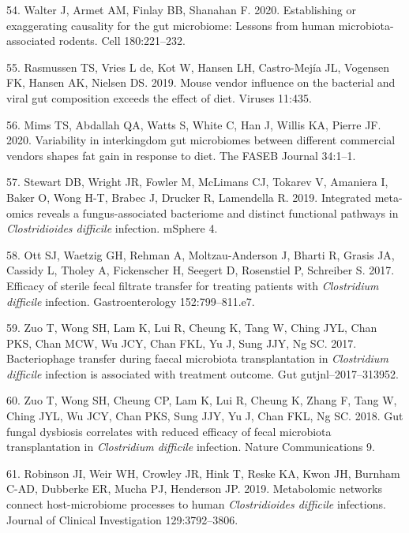 \documentclass[
  11pt,
]{article}
\begin{document}
\leavevmode\hypertarget{ref-Walter2020}{}%
54. Walter J, Armet AM, Finlay BB, Shanahan F. 2020. Establishing or
exaggerating causality for the gut microbiome: Lessons from human
microbiota-associated rodents. Cell 180:221--232.

\leavevmode\hypertarget{ref-Rasmussen2019}{}%
55. Rasmussen TS, Vries L de, Kot W, Hansen LH, Castro-Mejía JL,
Vogensen FK, Hansen AK, Nielsen DS. 2019. Mouse vendor influence on the
bacterial and viral gut composition exceeds the effect of diet. Viruses
11:435.

\leavevmode\hypertarget{ref-Mims2020}{}%
56. Mims TS, Abdallah QA, Watts S, White C, Han J, Willis KA, Pierre JF.
2020. Variability in interkingdom gut microbiomes between different
commercial vendors shapes fat gain in response to diet. The FASEB
Journal 34:1--1.

\leavevmode\hypertarget{ref-Stewart2019}{}%
57. Stewart DB, Wright JR, Fowler M, McLimans CJ, Tokarev V, Amaniera I,
Baker O, Wong H-T, Brabec J, Drucker R, Lamendella R. 2019. Integrated
meta-omics reveals a fungus-associated bacteriome and distinct
functional pathways in \emph{Clostridioides difficile} infection.
mSphere 4.

\leavevmode\hypertarget{ref-Ott2017}{}%
58. Ott SJ, Waetzig GH, Rehman A, Moltzau-Anderson J, Bharti R, Grasis
JA, Cassidy L, Tholey A, Fickenscher H, Seegert D, Rosenstiel P,
Schreiber S. 2017. Efficacy of sterile fecal filtrate transfer for
treating patients with \emph{Clostridium difficile} infection.
Gastroenterology 152:799--811.e7.

\leavevmode\hypertarget{ref-Zuo2017}{}%
59. Zuo T, Wong SH, Lam K, Lui R, Cheung K, Tang W, Ching JYL, Chan PKS,
Chan MCW, Wu JCY, Chan FKL, Yu J, Sung JJY, Ng SC. 2017. Bacteriophage
transfer during faecal microbiota transplantation in \emph{Clostridium
difficile} infection is associated with treatment outcome. Gut
gutjnl--2017--313952.

\leavevmode\hypertarget{ref-Zuo2018}{}%
60. Zuo T, Wong SH, Cheung CP, Lam K, Lui R, Cheung K, Zhang F, Tang W,
Ching JYL, Wu JCY, Chan PKS, Sung JJY, Yu J, Chan FKL, Ng SC. 2018. Gut
fungal dysbiosis correlates with reduced efficacy of fecal microbiota
transplantation in \emph{Clostridium difficile} infection. Nature
Communications 9.

\leavevmode\hypertarget{ref-Robinson2019}{}%
61. Robinson JI, Weir WH, Crowley JR, Hink T, Reske KA, Kwon JH, Burnham
C-AD, Dubberke ER, Mucha PJ, Henderson JP. 2019. Metabolomic networks
connect host-microbiome processes to human \emph{Clostridioides
difficile} infections. Journal of Clinical Investigation 129:3792--3806.
\end{document}
